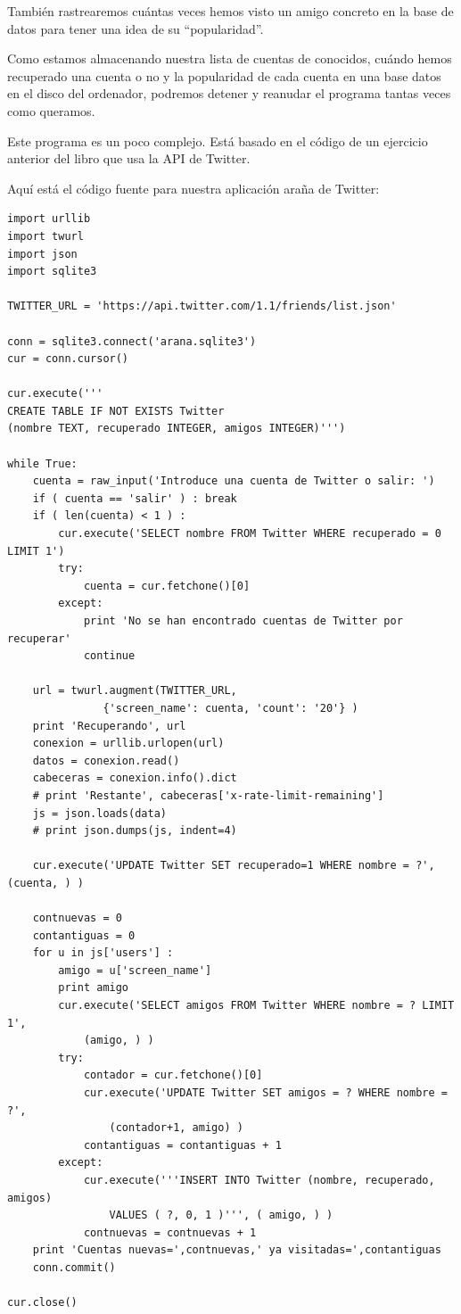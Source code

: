 También rastrearemos cuántas veces hemos visto un amigo concreto en la
base de datos para tener una idea de su ``popularidad''.

Como estamos almacenando nuestra lista de cuentas de conocidos,
cuándo hemos recuperado una cuenta o no
y la popularidad de cada cuenta
en una base datos en el disco del ordenador,
podremos detener y reanudar el programa tantas veces como queramos. 

Este programa es un poco complejo. Está basado en el código
de un ejercicio anterior del libro que usa la
API de Twitter.

Aquí está el código fuente para nuestra aplicación araña de Twitter:

\beforeverb
\begin{verbatim}
import urllib
import twurl
import json
import sqlite3

TWITTER_URL = 'https://api.twitter.com/1.1/friends/list.json'

conn = sqlite3.connect('arana.sqlite3')
cur = conn.cursor()

cur.execute('''
CREATE TABLE IF NOT EXISTS Twitter 
(nombre TEXT, recuperado INTEGER, amigos INTEGER)''')

while True:
    cuenta = raw_input('Introduce una cuenta de Twitter o salir: ')
    if ( cuenta == 'salir' ) : break
    if ( len(cuenta) < 1 ) :
        cur.execute('SELECT nombre FROM Twitter WHERE recuperado = 0 LIMIT 1')
        try:
            cuenta = cur.fetchone()[0]
        except:
            print 'No se han encontrado cuentas de Twitter por recuperar'
            continue

    url = twurl.augment(TWITTER_URL, 
               {'screen_name': cuenta, 'count': '20'} )
    print 'Recuperando', url
    conexion = urllib.urlopen(url)
    datos = conexion.read()
    cabeceras = conexion.info().dict
    # print 'Restante', cabeceras['x-rate-limit-remaining']
    js = json.loads(data)
    # print json.dumps(js, indent=4)

    cur.execute('UPDATE Twitter SET recuperado=1 WHERE nombre = ?', (cuenta, ) )

    contnuevas = 0
    contantiguas = 0
    for u in js['users'] :
        amigo = u['screen_name']
        print amigo
        cur.execute('SELECT amigos FROM Twitter WHERE nombre = ? LIMIT 1', 
            (amigo, ) )
        try:
            contador = cur.fetchone()[0]
            cur.execute('UPDATE Twitter SET amigos = ? WHERE nombre = ?', 
                (contador+1, amigo) )
            contantiguas = contantiguas + 1
        except:
            cur.execute('''INSERT INTO Twitter (nombre, recuperado, amigos) 
                VALUES ( ?, 0, 1 )''', ( amigo, ) )
            contnuevas = contnuevas + 1
    print 'Cuentas nuevas=',contnuevas,' ya visitadas=',contantiguas
    conn.commit()

cur.close()
\end{verbatim}
